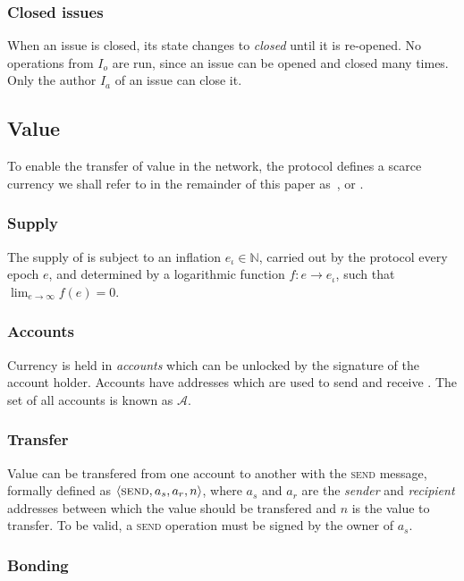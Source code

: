 \subsubsection{Closed issues} When an issue is closed, its state changes to
\emph{closed} until it is re-opened. No operations from $I_o$ are run, since
an issue can be opened and closed many times. Only the author $I_a$ of an issue
can close it.

\subsection{Value}

To enable the transfer of value in the network, the protocol defines a scarce
currency we shall refer to in the remainder of this paper as~\coin{}, or
\oscoin{}.

\subsubsection{Supply}

The supply of \coin{} is subject to an inflation $e_{\iota} \in \mathbb{N}$,
carried out by the protocol every epoch $e$, and determined by a logarithmic
function $f : e \to e_{\iota}$, such that $\lim_{e \to \infty} f(e) = 0$.

\subsubsection{Accounts}
\label{accounts}

Currency is held in \emph{accounts} which can be unlocked by the signature of
the account holder. Accounts have addresses which are used to send and receive
\coin{}. The set of all accounts is known as $\mathcal{A}$.

\subsubsection{Transfer}

Value can be transfered from one account to another with the \textsc{send}
message, formally defined as $\langle \text{\normalfont\scshape send}, a_{s}, a_{r}, n \rangle$, where $a_{s}$ and
$a_{r}$ are the \emph{sender} and \emph{recipient} addresses between which the
value should be transfered and $n$ is the value to transfer.  To be valid, a
\textsc{send} operation must be signed by the owner of $a_{s}$.

\subsubsection{Bonding}

